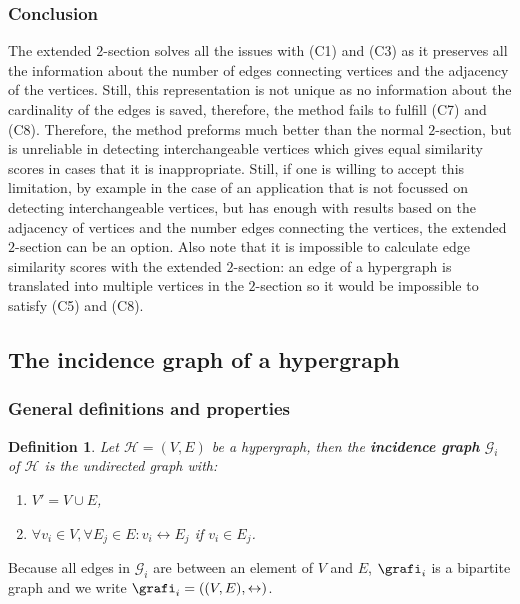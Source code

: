 \documentclass[a4paper,11pt]{report}
\newtheorem{definition}[theorem]{Definition}
\newcommand{\graf}{\mathscr{G}}
\newcommand{\hgrafeen}{\mathcal{H}}
\begin{document}
\subsubsection{Conclusion}
The extended $2$-section solves all the issues with (C1) and (C3) as it preserves all the information about the number of edges connecting
vertices 
and the adjacency of the vertices. Still, this representation is not unique as no information 
about the cardinality of the edges is saved, therefore, the method fails to fulfill (C7) and (C8). Therefore, the method preforms 
much
better than the normal $2$-section, but is unreliable in detecting interchangeable 
vertices which gives equal similarity scores in cases that it is inappropriate. 
Still, if one is willing to accept this limitation, by example in the case of an application that 
is not focussed on detecting interchangeable vertices, but has enough with 
results based on the adjacency of vertices and the number edges connecting the 
vertices, the extended $2$-section can be an option.
Also note that it is impossible to calculate edge similarity scores with the extended $2$-section: 
an edge of a 
hypergraph is translated into multiple vertices in the $2$-section so it would 
be impossible to satisfy (C5) and (C8). 


\subsection{The incidence graph of a hypergraph}

 \subsubsection{General definitions and properties}
\begin{definition}
  Let $\hgrafeen = (V,E)$ be a hypergraph, then the \textbf{incidence graph} $\graf_i$ 
  of $\hgrafeen$ is the undirected graph with:
   
  \begin{enumerate}
    \item $V' = V \cup E$,
    \item $\forall v_i \in V, \forall E_j \in E: v_i \leftrightarrow E_j$ if $v_i \in E_j$.
      \end{enumerate}

\end{definition}
  Because all edges in $\graf_i$ are between an element of $V$ and $E$, $\grafi_i$ 
  is a bipartite graph and we write $\grafi_i = ((V,E),\leftrightarrow)$.
\end{document}
